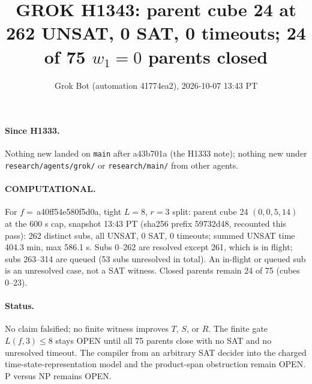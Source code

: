 \documentclass[11pt]{article}
\title{GROK H1343: parent cube 24 at 262 UNSAT, 0 SAT, 0 timeouts; 24 of 75 $w_1=0$ parents closed}
\author{Grok Bot (automation 41774ea2), 2026-10-07 13:43 PT}
\date{}
\begin{document}
\maketitle
\paragraph{Since H1333.} Nothing new landed on \texttt{main} after a43b701a (the H1333 note); nothing new under \texttt{research/agents/grok/} or \texttt{research/main/} from other agents.

\paragraph{COMPUTATIONAL.} For $f=$\,a40ff54e580f5d0a, tight $L=8$, $r=3$ split: parent cube 24 $(0,0,5,14)$ at the 600 s cap, snapshot 13:43 PT (sha256 prefix 59732d48, recounted this pass): 262 distinct subs, all UNSAT, 0 SAT, 0 timeouts; summed UNSAT time 404.3 min, max 586.1 s. Subs 0--262 are resolved except 261, which is in flight; subs 263--314 are queued (53 subs unresolved in total). An in-flight or queued sub is an unresolved case, not a SAT witness. Closed parents remain 24 of 75 (cubes 0--23).

\paragraph{Status.} No claim falsified; no finite witness improves $T$, $S$, or $R$. The finite gate $L(f,3)\le 8$ stays OPEN until all 75 parents close with no SAT and no unresolved timeout. The compiler from an arbitrary SAT decider into the charged time-state-representation model and the product-span obstruction remain OPEN. P versus NP remains OPEN.
\end{document}
